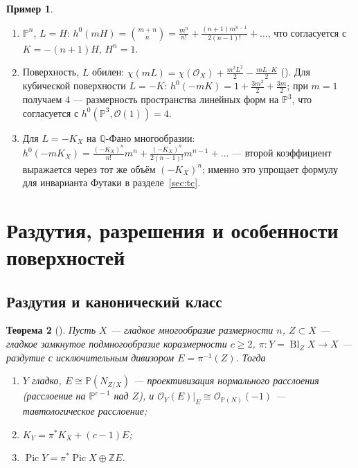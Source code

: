 \documentclass[11pt,a4paper]{article}
\theoremstyle{plain}
\newtheorem{theorem}{Теорема}[section]
\theoremstyle{definition}
\newtheorem{example}[theorem]{Пример}
\theoremstyle{remark}
\newcommand{\Z}{\mathbb{Z}}
\newcommand{\Q}{\mathbb{Q}}
\newcommand{\PP}{\mathbb{P}}
\newcommand{\cO}{\mathcal{O}}
\DeclareMathOperator{\Pic}{Pic}
\DeclareMathOperator{\Bl}{Bl}
\begin{document}
\begin{example}
\begin{enumerate}
\item $\PP^n$, $L=H$: $h^0(mH)=\binom{m+n}{n}=\frac{m^n}{n!}+\frac{(n+1)m^{n-1}}{2(n-1)!}+\dots$,
что согласуется с $K=-(n+1)H$, $H^n=1$.
\item Поверхность, $L$ обилен: $\chi(mL)=\chi(\cO_X)+\frac{m^2L^2}2-\frac{mL\cdot K}2$
(\cite[V.1.6]{Ha}). Для кубической поверхности $L=-K$: $h^0(-mK)=1+\frac{3m^2}2+\frac{3m}2$;
при $m=1$ получаем $4$ --- размерность пространства линейных форм на $\PP^3$, что согласуется с $h^0(\PP^3,\cO(1))=4$.
\item Для $L=-K_X$ на $\Q$-Фано многообразии: $h^0(-mK_X)=\frac{(-K_X)^n}{n!}m^n+\frac{(-K_X)^n}{2(n-1)!}m^{n-1}+\dots$
--- второй коэффициент выражается через тот же объём $(-K_X)^n$; именно это упрощает формулу для
инварианта Футаки в разделе~\ref{sec:tc}.
\end{enumerate}
\end{example}

\section{Раздутия, разрешения и особенности поверхностей}\label{sec:sing}

\subsection{Раздутия и канонический класс}

\begin{theorem}[{\cite[II.8.24, II, упр.~8.5]{Ha}}]\label{thm:blowup-K}
Пусть $X$ --- гладкое многообразие размерности $n$, $Z\subset X$ --- гладкое замкнутое
подмногообразие коразмерности $c\ge2$, $\pi\colon Y=\Bl_ZX\to X$ --- раздутие с исключительным
дивизором $E=\pi^{-1}(Z)$. Тогда
\begin{enumerate}
\item $Y$ гладко, $E\cong\PP(N_{Z/X})$ --- проективизация нормального расслоения \textup{(}расслоение на
$\PP^{c-1}$ над $Z$\textup{)}, и $\cO_Y(E)|_E\cong\cO_{\PP(N)}(-1)$ --- тавтологическое расслоение;
\item $K_Y=\pi^*K_X+(c-1)E$;
\item $\Pic Y=\pi^*\Pic X\oplus\Z E$.
\end{enumerate}
\end{theorem}
\end{document}
